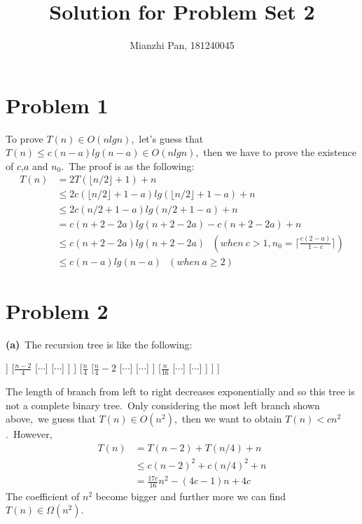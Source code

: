 \documentclass[]{article}
\title{Solution for Problem Set 2}
\author{Mianzhi Pan, 181240045}
\begin{document}
	\maketitle
	\section{Problem 1}
	To prove $T(n)\in O(nlgn)$,\ let's guess that $T(n)\leq c(n-a)lg(n-a) \in O(nlgn)$,\ then we have to prove the existence of $c$,$a$ and $n_0$.\ The proof is as the following:
	\begin{equation*}
	\begin{aligned}
	T(n) &= 2T(\lfloor n/2\rfloor + 1) + n\\
	&\leq 2c(\lfloor n/2\rfloor + 1 -a)lg(\lfloor n/2\rfloor + 1 -a) + n\\
	&\leq 2c(n/2 + 1 - a)lg(n/2 + 1 -a) + n\\
	&=c(n + 2 -2a)lg(n + 2 - 2a) - c(n + 2 - 2a) + n\\
	&\leq c(n + 2 -2a)lg(n + 2 - 2a)\ \ \ (when\ c>1, n_0 = \lceil\frac{c(2-a)}{1-c}\rceil)\\
	&\leq c(n - a)lg(n - a)\ \ \ (when\ a\geq 2)
	\end{aligned}
	\end{equation*} 
	
	\section{Problem 2}
	\textbf{(a)}\ The recursion tree is like the following:
	
	\begin{forest}
		[$n$
			[$n-2$
				[$n - 4$
					[$\cdots$]
					[$\cdots$]
				]
				[$\frac{n - 2}{4}$
					[$\cdots$]
					[$\cdots$]
				]
			]
			[$\frac{n}{4}$
				[$\frac{n}{4} - 2$
					[$\cdots$]
					[$\cdots$]
				]
				[$\frac{n}{16}$
					[$\cdots$]
					[$\cdots$]
				]
			]
		]
	\end{forest}

	The length of branch from left to right decreases exponentially and so this tree is not a complete binary tree.\ Only considering the most left branch shown above,\ we guess that $T(n)\in O(n^2)$,\ then we want to obtain $T(n)<cn^2$.\ However, 	
	\begin{equation*}
		\begin{aligned}
		T(n) &= T(n - 2) + T(n/4) + n\\
		&\leq c(n - 2)^2 + c(n / 4)^2 + n\\
		&=\frac{17c}{16}n^2 - (4c - 1)n + 4c
		\end{aligned}
	\end{equation*}
	The coefficient of $n^2$ become bigger and further more we can find $T(n) \in \Omega(n^2)$.
	
\end{document}
